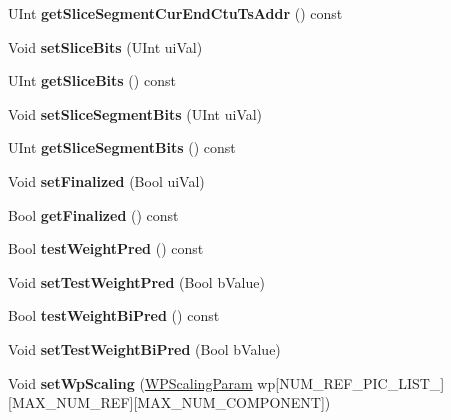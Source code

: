 \begin{DoxyCompactItemize}
U\+Int {\bfseries get\+Slice\+Segment\+Cur\+End\+Ctu\+Ts\+Addr} () const
\item 
\mbox{\label{class_t_com_slice_a976593b0583da2384838070006f4c8df}} 
Void {\bfseries set\+Slice\+Bits} (U\+Int ui\+Val)
\item 
\mbox{\label{class_t_com_slice_afefce7cc5d3c4b2080593db2f2e37c4e}} 
U\+Int {\bfseries get\+Slice\+Bits} () const
\item 
\mbox{\label{class_t_com_slice_a808ba641e8b6f7ad6ceb89d2c7ea5035}} 
Void {\bfseries set\+Slice\+Segment\+Bits} (U\+Int ui\+Val)
\item 
\mbox{\label{class_t_com_slice_a976d2a1b2d19cf13fb415b7bfe37f090}} 
U\+Int {\bfseries get\+Slice\+Segment\+Bits} () const
\item 
\mbox{\label{class_t_com_slice_a8b0cbe672e4a2a283b5c49f89d8bb417}} 
Void {\bfseries set\+Finalized} (Bool ui\+Val)
\item 
\mbox{\label{class_t_com_slice_a6b17efd70c1feceb573f7aa101160f7f}} 
Bool {\bfseries get\+Finalized} () const
\item 
\mbox{\label{class_t_com_slice_ac6aa3c6b574b74905663b267c18bd6f5}} 
Bool {\bfseries test\+Weight\+Pred} () const
\item 
\mbox{\label{class_t_com_slice_a2b5a76bb18b3b40238026ef71decf8ca}} 
Void {\bfseries set\+Test\+Weight\+Pred} (Bool b\+Value)
\item 
\mbox{\label{class_t_com_slice_a972fd58eb2e5ce659758bd8131dd5fd4}} 
Bool {\bfseries test\+Weight\+Bi\+Pred} () const
\item 
\mbox{\label{class_t_com_slice_a10041bde12fd21060ea31ba86c08f8c5}} 
Void {\bfseries set\+Test\+Weight\+Bi\+Pred} (Bool b\+Value)
\item 
\mbox{\label{class_t_com_slice_a99019490942e0a475e93c5dbd08b518c}} 
Void {\bfseries set\+Wp\+Scaling} (\hyperlink{struct_w_p_scaling_param}{W\+P\+Scaling\+Param} wp\mbox{[}N\+U\+M\+\_\+\+R\+E\+F\+\_\+\+P\+I\+C\+\_\+\+L\+I\+S\+T\+\_\mbox{]}\mbox{[}M\+A\+X\+\_\+\+N\+U\+M\+\_\+\+R\+EF\mbox{]}\mbox{[}M\+A\+X\+\_\+\+N\+U\+M\+\_\+\+C\+O\+M\+P\+O\+N\+E\+NT\mbox{]})

\end{DoxyCompactItemize}
